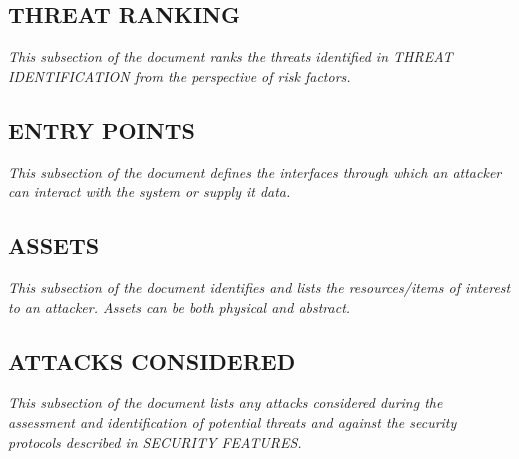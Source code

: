 \documentclass[twoside,letterpaper]{article}
\begin{document}
\subsection{THREAT RANKING}
{\itshape\color{black}
This subsection of the document ranks the threats identified in THREAT IDENTIFICATION
 from the perspective of risk factors. \ }

\subsection{ENTRY POINTS}
{\itshape\color{black}
This subsection of the document defines the interfaces through which an attacker
can interact with the system or supply it data. \ }

\subsection{ASSETS}
{\itshape\color{black}
This subsection of the document identifies and lists the resources/items
of interest to an attacker. Assets can be both physical and abstract. \ }

\subsection{ATTACKS CONSIDERED}
{\itshape\color{black}
This subsection of the document lists any attacks considered during the
assessment and identification of potential threats and against the security
protocols described in SECURITY FEATURES.
\ }
\end{document}
